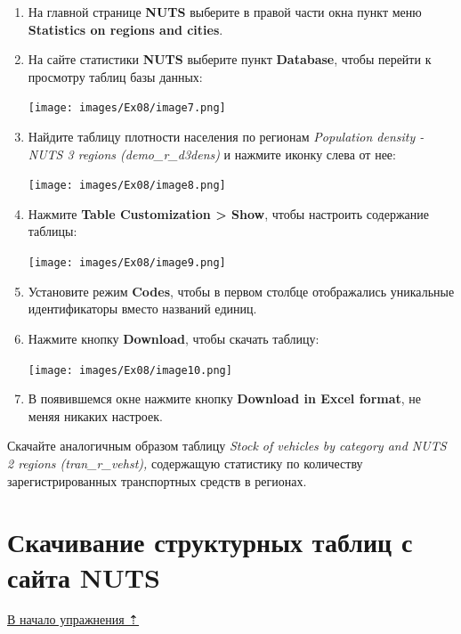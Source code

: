 \documentclass[12pt,]{book}
\begin{document}
\begin{enumerate}
\def\labelenumi{\arabic{enumi}.}
\item
  На главной странице \textbf{NUTS} выберите в правой части окна пункт меню \textbf{Statistics on regions and cities}.
\item
  На сайте статистики \textbf{NUTS} выберите пункт \textbf{Database}, чтобы перейти к просмотру таблиц базы данных:

  \texttt{[image: images/Ex08/image7.png]}
\item
  Найдите таблицу плотности населения по регионам \emph{Population density - NUTS 3 regions (demo\_r\_d3dens)} и нажмите иконку слева от нее:

  \texttt{[image: images/Ex08/image8.png]}
\item
  Нажмите \textbf{Table Customization \textgreater{} Show}, чтобы настроить содержание таблицы:

  \texttt{[image: images/Ex08/image9.png]}
\item
  Установите режим \textbf{Codes}, чтобы в первом столбце отображались уникальные идентификаторы вместо названий единиц.
\item
  Нажмите кнопку \textbf{Download}, чтобы скачать таблицу:

  \texttt{[image: images/Ex08/image10.png]}
\item
  В появившемся окне нажмите кнопку \textbf{Download in Excel format}, не меняя никаких настроек.
\end{enumerate}

Скачайте аналогичным образом таблицу \emph{Stock of vehicles by category and NUTS 2 regions (tran\_r\_vehst),} содержащую статистику по количеству зарегистрированных транспортных средств в регионах.

\hypertarget{stat-map-economic-structures}{%
\section{Скачивание структурных таблиц с сайта NUTS}\label{stat-map-economic-structures}}

\protect\hyperlink{stat-map-economic}{В начало упражнения ⇡}
\end{document}
